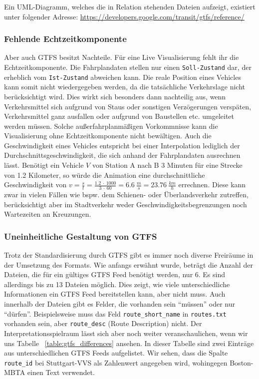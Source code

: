       Ein UML-Diagramm, welches die in Relation stehenden Dateien aufzeigt, existiert unter folgender Adresse: \url{https://developers.google.com/transit/gtfs/reference/} 

      \subsubsection*{Fehlende Echtzeitkomponente}
      \label{ssub:fehlende_echtzeitkomponente}
        Aber auch GTFS besitzt Nachteile. Für eine Live Visualisierung fehlt ihr die Echtzeitkomponente. Die Fahrplandaten stellen nur einen \texttt{Soll-Zustand} dar, der erheblich vom \texttt{Ist-Zustand} abweichen kann. Die reale Position eines Vehicles kann somit nicht wiedergegeben werden, da die tatsächliche Verkehrslage nicht berücksichtigt wird. Dies wirkt sich besonders dann nachteilig aus, wenn Verkehrsmittel sich aufgrund von Staus oder sonstigen Verzögerungen verspäten, Verkehrsmittel ganz ausfallen oder aufgrund von Baustellen etc. umgeleitet werden müssen. Solche außerfahrplanmäßigen Vorkommnisse kann die Visualisierung ohne Echtzeitkomponente nicht bewältigen.
        Auch die Geschwindigkeit eines Vehicles entspricht bei einer Interpolation lediglich der Durchschnittsgeschwindigkeit, die sich anhand der Fahrplandaten ausrechnen lässt. Benötigt ein Vehicle $V$ von Station A nach B 3 Minuten für eine Strecke von 1.2 Kilometer, so würde die Animation eine durchschnittliche Geschwindigkeit von $v = \frac{s}{t} = \frac{1.2 \: \cdot \: 1000}{3 \: \cdot \: 60} = 6.6 \: \frac{m}{s} = 23.76 \: \frac{km}{h}$ errechnen. Diese kann zwar in vielen Fällen wie bspw. dem Schienen- oder Überlandsverkehr zutreffen, berücksichtigt aber im Stadtverkehr weder Geschwindigkeitsbegrenzungen noch Wartezeiten an Kreuzungen. 


      \subsubsection*{Uneinheitliche Gestaltung von GTFS}
      \label{ssub:uneinheitliche_gestaltung_von_gtfs}
        Trotz der Standardisierung durch GTFS gibt es immer noch diverse Freiräume in der Umsetzung des Formats. Wie anfangs erwähnt wurde, beträgt die Anzahl der Dateien, die für ein gültiges GTFS Feed benötigt werden, nur 6. Es sind allerdings bis zu 13 Dateien möglich. Dies zeigt, wie viele unterschiedliche Informationen ein GTFS Feed bereitstellen kann, aber nicht muss. 
        Auch innerhalb der Dateien gibt es Felder, die vorhanden sein "`müssen"' oder nur "`dürfen"'. Beispielsweise muss das Feld \texttt{route\_short\_name} in \texttt{routes.txt} vorhanden sein, aber \texttt{route\_desc} (Route Description) nicht. Der Interpretationsspielraum lässt sich aber noch weiter veranschaulichen, wenn wir uns Tabelle ~\ref{table:gtfs_differences} ansehen. In dieser Tabelle sind zwei Einträge aus unterschiedlichen GTFS Feeds aufgelistet.
        Wir sehen, dass die Spalte \texttt{route\_id} bei Stuttgart-VVS als Zahlenwert angegeben wird, wohingegen Boston-MBTA einen Text verwendet.

